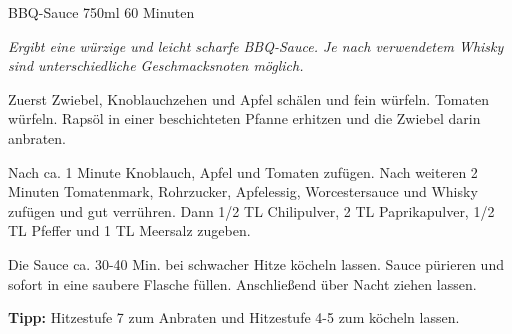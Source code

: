 \documentclass[
  DIV=11,%
  pagesize,%
  fontsize=11pt,%
  paper=a4,%
]{scrartcl}
\begin{document}
\begin{recipe}{BBQ-Sauce} {750ml} {60 Minuten}

\freeform
\textit{Ergibt eine würzige und leicht scharfe BBQ-Sauce.
Je nach verwendetem Whisky sind unterschiedliche Geschmacksnoten möglich.}


Zuerst Zwiebel, Knoblauchzehen und Apfel schälen und fein würfeln.
Tomaten würfeln.
Rapsöl in einer beschichteten Pfanne erhitzen und die Zwiebel darin anbraten.


Nach ca. 1 Minute Knoblauch, Apfel und Tomaten zufügen.
Nach weiteren 2 Minuten Tomatenmark, Rohrzucker, Apfelessig, Worcestersauce und Whisky zufügen und gut verrühren.
Dann 1/2 TL Chilipulver, 2 TL Paprikapulver, 1/2 TL Pfeffer und 1 TL Meersalz zugeben.

\newstep
Die Sauce ca. 30-40 Min. bei schwacher Hitze köcheln lassen.
Sauce pürieren und sofort in eine saubere Flasche füllen.
Anschließend über Nacht ziehen lassen.

\freeform
\hrulefill

\freeform 
\textbf{Tipp:}
Hitzestufe 7 zum Anbraten und Hitzestufe 4-5 zum köcheln lassen.

\end{recipe}
\end{document}
